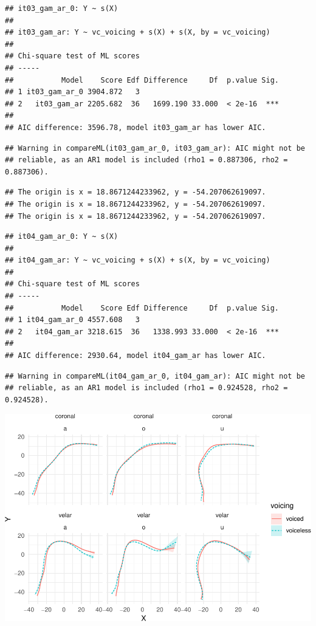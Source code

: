 \documentclass[12pt,]{article}
\begin{document}
\begin{verbatim}
## it03_gam_ar_0: Y ~ s(X)
## 
## it03_gam_ar: Y ~ vc_voicing + s(X) + s(X, by = vc_voicing)
## 
## Chi-square test of ML scores
## -----
##           Model    Score Edf Difference     Df  p.value Sig.
## 1 it03_gam_ar_0 3904.872   3                                
## 2   it03_gam_ar 2205.682  36   1699.190 33.000  < 2e-16  ***
## 
## AIC difference: 3596.78, model it03_gam_ar has lower AIC.
\end{verbatim}

\begin{verbatim}
## Warning in compareML(it03_gam_ar_0, it03_gam_ar): AIC might not be
## reliable, as an AR1 model is included (rho1 = 0.887306, rho2 = 0.887306).
\end{verbatim}

\begin{verbatim}
## The origin is x = 18.8671244233962, y = -54.207062619097.
## The origin is x = 18.8671244233962, y = -54.207062619097.
## The origin is x = 18.8671244233962, y = -54.207062619097.
\end{verbatim}

\begin{verbatim}
## it04_gam_ar_0: Y ~ s(X)
## 
## it04_gam_ar: Y ~ vc_voicing + s(X) + s(X, by = vc_voicing)
## 
## Chi-square test of ML scores
## -----
##           Model    Score Edf Difference     Df  p.value Sig.
## 1 it04_gam_ar_0 4557.608   3                                
## 2   it04_gam_ar 3218.615  36   1338.993 33.000  < 2e-16  ***
## 
## AIC difference: 2930.64, model it04_gam_ar has lower AIC.
\end{verbatim}

\begin{verbatim}
## Warning in compareML(it04_gam_ar_0, it04_gam_ar): AIC might not be
## reliable, as an AR1 model is included (rho1 = 0.924528, rho2 = 0.924528).
\end{verbatim}

\includegraphics{2018-polar-gam_files/figure-latex/unnamed-chunk-1-1.pdf}
\end{document}
